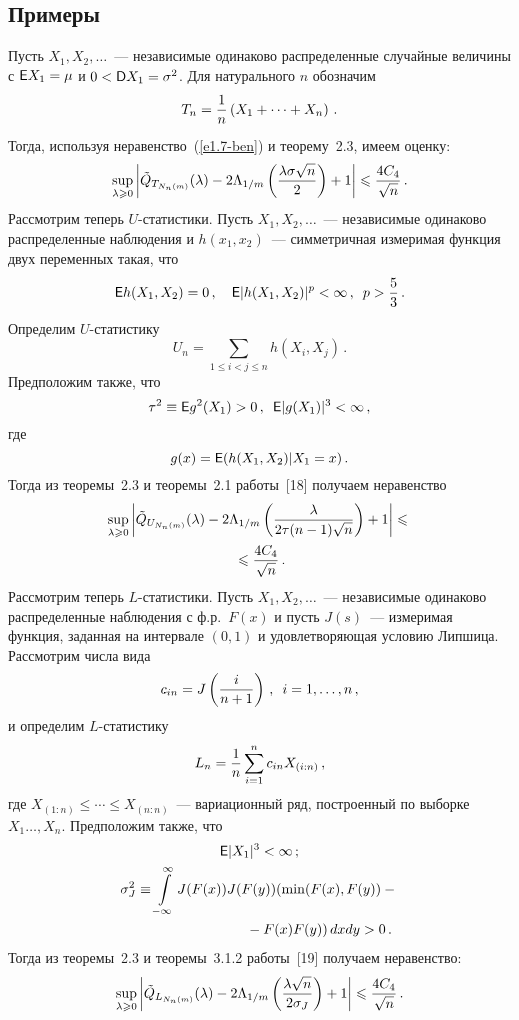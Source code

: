 \begin{multicols}{2}
\subsection{Примеры}

Пусть $X_1,X_2,\ldots$~--- независимые одинаково распределенные
случайные величины с ${\sf E}X_1\hm=\mu$ и $0\hm<{\sf D}X_1\hm=\sigma^2$. Для
натурального $n$ обозначим
$$
T_n=\displaystyle\frac{\displaystyle 1\mathstrut}{\displaystyle n\mathstrut}\left(X_1+\cdots+X_n\right)\,.
$$
Тогда, используя неравенство~(\ref{e1.7-ben}) и теорему~2.3, имеем  оценку:
$$
\sup\limits_{\lambda\geqslant 0}\left\vert\tilde Q_{T_{N_n(m)}}(\lambda)-
2\Lambda_{1/m}\left(\displaystyle\frac{\displaystyle \lambda\sigma\sqrt n\mathstrut}{\displaystyle 2\mathstrut}\right)+1\right\vert\leqslant
\displaystyle\frac{\displaystyle 4C_4\mathstrut}{\displaystyle \sqrt n\mathstrut}\,.
$$
Рассмотрим теперь $U$-статистики. Пусть $X_1,X_2,\ldots$~---
независимые одинаково распределенные наблюдения и $h(x_1,x_2)$~---
симметричная измеримая функция двух переменных такая, что
$$
{\sf E}h(X_1,X_2)=0\,,\ \ \ {\sf E}|h(X_1,X_2)|^p< \infty\,,\enskip p >\displaystyle\frac{\displaystyle 5\mathstrut}{\displaystyle 3\mathstrut}\,.
$$
Определим  $U$-статистику
$$
U_n=\sum\limits_{1\leqslant  i<j\leqslant  n}h(X_i,X_j)\,.
$$
Предположим также, что
$$
\tau^2\equiv{\sf E}g^2(X_1)>0\,,\enskip {\sf E}|g(X_1)|^3<\infty\,,
$$
где
$$
g(x)={\sf E}(h(X_1,X_2)|X_1=x)\,.
$$
Тогда из теоремы~2.3 и теоремы~2.1 работы~[18] получаем неравенство
\begin{multline*}
\sup\limits_{\lambda\geqslant 0}\left\vert\tilde Q_{U_{N_n(m)}}(\lambda)-
2\Lambda_{1/m}\left(\displaystyle\frac{\displaystyle \lambda\mathstrut}{\displaystyle 2\tau(n-1)\sqrt n\mathstrut}\right)+1\right\vert \leqslant{}\\
{}\leqslant
\displaystyle\frac{\displaystyle 4C_4\mathstrut}{\displaystyle \sqrt n\mathstrut}\,.
\end{multline*}
Рассмотрим теперь $L$-статистики. Пусть $X_1,X_2,\ldots$~---
независимые одинаково распределенные наблюдения с ф.р.\ $F(x)$ и
пусть $J(s)$~--- измеримая функция, заданная на интервале $(0,1)$  и
удовлетворяющая условию Липшица. Рассмотрим числа вида
$$
c_{in}=J\left(\displaystyle\frac{\displaystyle i\mathstrut}{\displaystyle n+1\mathstrut}\right)\,,\enskip i=1,\ldots,n\,,
$$
и определим  $L$-статистику
$$
L_n=\displaystyle\frac{\displaystyle 1\mathstrut}{\displaystyle n\mathstrut}\sum\limits_{i=1}^nc_{in}X_{(i:n)}\,,
$$
где $X_{(1:n)}\leqslant \cdots\leqslant  X_{(n:n)}$~--- вариационный ряд,
построенный по выборке $X_1\ldots,X_n$. Предположим также, что
\begin{gather*}
{\sf E}|X_1|^3<\infty\,;\\ 
\sigma^2_J\equiv
\int\limits_{-\infty}^{\infty}J(F(x))J(F(y))(\min(F(x),F(y))-{}\\
\hspace*{30mm}{}-F(x)F(y)) \,dxdy>0\,.
\end{gather*}
Тогда из теоремы~2.3 и теоремы~3.1.2 работы~[19] получаем
неравенство:
$$
\sup\limits_{\lambda\geqslant 0}\left\vert\tilde Q_{L_{N_n(m)}}(\lambda)-
2\Lambda_{1/m}\left(\displaystyle\frac{\displaystyle \lambda\sqrt n\mathstrut}{\displaystyle 2\sigma_J\mathstrut}\right)+1\right\vert\leqslant
\displaystyle\frac{\displaystyle 4C_4\mathstrut}{\displaystyle \sqrt n\mathstrut}\,.
$$


\end{multicols}
